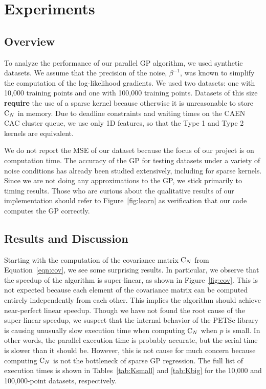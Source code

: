 \section{Experiments}
\label{sec:experiments}

\subsection{Overview}
\label{sub:overview}

To analyze the performance of our parallel \ac{GP} algorithm, we used synthetic datasets.
We assume that the precision of the noise, $\beta^{-1}$, was known to simplify the
computation of the log-likelihood gradients.  We used two datasets: one with 10,000
training points and one with 100,000 training points.  Datasets of this size {\bf require}
the use of a sparse kernel because otherwise it is unreasonable to store
$\mathrm{C}_N$ in memory.  Due to deadline constraints and waiting times on the CAEN CAC
cluster queue, we use only 1D features, so that the Type 1 and Type 2 kernels are
equivalent.

We do not report the \ac{MSE} of our dataset because the focus of our project is on
computation time.  The accuracy of the \ac{GP} for testing datasets under a variety of
noise conditions has already been studied extensively, including for sparse kernels.
Since we are not doing any approximations to the \ac{GP}, we stick primarily to timing
results.  Those who are curious about the qualitative results of our implementation should
refer to Figure~\ref{fig:learn} as verification that our code computes the GP correctly.

\subsection{Results and Discussion}
\label{sub:results}

Starting with the computation of the covariance matrix $\mathrm{C}_N$ from
Equation~\ref{eqn:cov}, we see some surprising results.  In particular, we observe that
the speedup of the algorithm is super-linear, as shown in Figure~\ref{fig:cov}.  This is
not expected because each element of the covariance matrix can be computed entirely
independently from each other.  This implies the algorithm should achieve near-perfect
linear speedup.  Though we have not found the root cause of the super-linear speedup, we
suspect that the internal behavior of the \ac{PETSc} library is causing unusually slow
execution time when computing $\mathrm{C}_N$ when $p$ is small.  In other words, the parallel
execution time is probably accurate, but the serial time is slower than it should be.
However, this is not cause for much concern because computing $\mathrm{C}_N$ is not the
bottleneck of sparse \ac{GP} regression.  The full list of execution times is shown in
Tables~\ref{tab:Ksmall} and \ref{tab:Kbig} for the 10,000 and 100,000-point datasets,
respectively.

